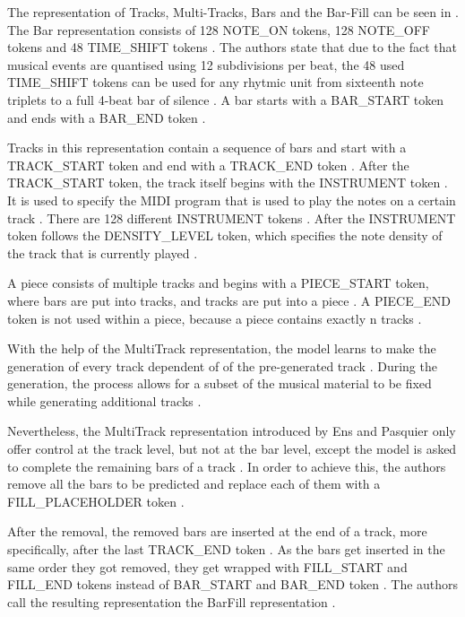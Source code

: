 The representation of Tracks, Multi-Tracks, Bars and the Bar-Fill can be seen in .
The Bar representation consists of 128 NOTE\_ON tokens, 128 NOTE\_OFF tokens and 
48 TIME\_SHIFT tokens \cite{ens2020mmm}. The authors state
that due to the fact that musical events are quantised using 12 subdivisions per beat, the 48 used TIME\_SHIFT tokens
can be used for any rhytmic unit from
sixteenth note triplets to a full 4-beat
bar of silence \cite{ens2020mmm}. A bar 
starts with a BAR\_START token and ends
with a BAR\_END token \cite{ens2020mmm}. 

Tracks in this representation contain a sequence of bars and start with a 
TRACK\_START token and end with a TRACK\_END token \cite{ens2020mmm}.
After the TRACK\_START token, the track itself begins with the INSTRUMENT token \cite{ens2020mmm}.
It is used to specify the MIDI program that is used to play the notes on a 
certain track \cite{ens2020mmm}. There are 128 different INSTRUMENT tokens \cite{ens2020mmm}.
After the INSTRUMENT token follows the DENSITY\_LEVEL token, which specifies the note 
density of the track that is currently played \cite{ens2020mmm}.

A piece consists of multiple tracks and begins with a PIECE\_START token,
where bars are put into tracks, and tracks are put into a piece \cite{ens2020mmm}.
A PIECE\_END token is not used within a piece, because a piece contains exactly 
n tracks \cite{ens2020mmm}.

With the help of the MultiTrack representation, the model learns to make the generation
of every track dependent of of the pre-generated track \cite{ens2020mmm}.
During the generation, the process allows for a subset of the musical material to be
fixed while generating additional tracks \cite{ens2020mmm}.

Nevertheless, the MultiTrack representation introduced by Ens and Pasquier only offer control at the track level, but not at the bar level, except the model is asked to complete the remaining bars of a track \cite{ens2020mmm}. In order to achieve this, 
the authors remove all the bars to be predicted and replace each of them with a
FILL\_PLACEHOLDER token \cite{ens2020mmm}. 

After the removal, the removed bars are inserted at the end of a track, more specifically,
after the last TRACK\_END token \cite{ens2020mmm}. As the bars get inserted in the same 
order they got removed, they get wrapped with FILL\_START and FILL\_END tokens instead of 
BAR\_START and BAR\_END token \cite{ens2020mmm}. The authors call the resulting 
representation the BarFill representation \cite{ens2020mmm}.

